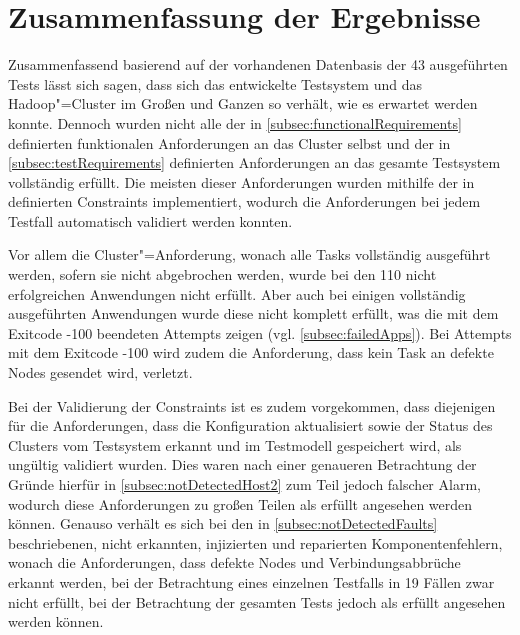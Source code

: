 \section{Zusammenfassung der Ergebnisse}
\label{sec:evaluationResults}

Zusammenfassend basierend auf der vorhandenen Datenbasis der 43 ausgeführten Tests lässt sich sagen, dass sich das entwickelte Testsystem und das Hadoop"=Cluster im Großen und Ganzen so verhält, wie es erwartet werden konnte.
Dennoch wurden nicht alle der in \cref{subsec:functionalRequirements} definierten funktionalen Anforderungen an das Cluster selbst und der in \cref{subsec:testRequirements} definierten Anforderungen an das gesamte Testsystem vollständig erfüllt.
Die meisten dieser Anforderungen wurden mithilfe der in  definierten Constraints implementiert, wodurch die Anforderungen bei jedem Testfall automatisch validiert werden konnten.

Vor allem die Cluster"=Anforderung, wonach alle Tasks vollständig ausgeführt werden, sofern sie nicht abgebrochen werden, wurde bei den 110 nicht erfolgreichen Anwendungen nicht erfüllt.
Aber auch bei einigen vollständig ausgeführten Anwendungen wurde diese nicht komplett erfüllt, was die mit dem Exitcode -100 beendeten Attempts zeigen (vgl. \cref{subsec:failedApps}).
Bei Attempts mit dem Exitcode -100 wird zudem die Anforderung, dass kein Task an defekte Nodes gesendet wird, verletzt.

Bei der Validierung der Constraints ist es zudem vorgekommen, dass diejenigen für die Anforderungen, dass die Konfiguration aktualisiert sowie der Status des Clusters vom Testsystem erkannt und im Testmodell gespeichert wird, als ungültig validiert wurden.
Dies waren nach einer genaueren Betrachtung der Gründe hierfür in \cref{subsec:notDetectedHost2} zum Teil jedoch falscher Alarm, wodurch diese Anforderungen zu großen Teilen als erfüllt angesehen werden können.
Genauso verhält es sich bei den in \cref{subsec:notDetectedFaults} beschriebenen, nicht erkannten, injizierten und reparierten Komponentenfehlern, wonach die Anforderungen, dass defekte Nodes und Verbindungsabbrüche erkannt werden, bei der Betrachtung eines einzelnen Testfalls in 19 Fällen zwar nicht erfüllt, bei der Betrachtung der gesamten Tests jedoch als erfüllt angesehen werden können.

